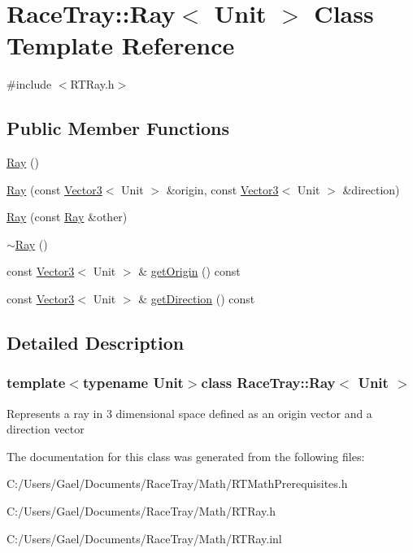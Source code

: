\hypertarget{class_race_tray_1_1_ray}{\section{Race\-Tray\-:\-:Ray$<$ Unit $>$ Class Template Reference}
\label{class_race_tray_1_1_ray}
}


{\ttfamily \#include $<$R\-T\-Ray.\-h$>$}

\subsection*{Public Member Functions}
\begin{DoxyCompactItemize}
\item 
\hyperlink{group___math_ga2e3d2c29f2df4ab3da10da79d4acb852}{Ray} ()
\item 
\hyperlink{group___math_gabe89aef5906b96af94ad94ad0deba455}{Ray} (const \hyperlink{class_race_tray_1_1_vector3}{Vector3}$<$ Unit $>$ \&origin, const \hyperlink{class_race_tray_1_1_vector3}{Vector3}$<$ Unit $>$ \&direction)
\item 
\hyperlink{group___math_ga8e46b1356e03d968ffd813076d6818b2}{Ray} (const \hyperlink{class_race_tray_1_1_ray}{Ray} \&other)
\item 
\hyperlink{group___math_ga8b0e575ce5df046c0c7615c32a96a46f}{$\sim$\-Ray} ()
\item 
const \hyperlink{class_race_tray_1_1_vector3}{Vector3}$<$ Unit $>$ \& \hyperlink{group___math_gab1690c909fff67ff5c878aa6f05bfe2b}{get\-Origin} () const 
\item 
const \hyperlink{class_race_tray_1_1_vector3}{Vector3}$<$ Unit $>$ \& \hyperlink{group___math_gaab0b0ed57af0899286c2996dfdc9418b}{get\-Direction} () const 
\end{DoxyCompactItemize}


\subsection{Detailed Description}
\subsubsection*{template$<$typename Unit$>$class Race\-Tray\-::\-Ray$<$ Unit $>$}

Represents a ray in 3 dimensional space defined as an origin vector and a direction vector 

The documentation for this class was generated from the following files\-:\begin{DoxyCompactItemize}
\item 
C\-:/\-Users/\-Gael/\-Documents/\-Race\-Tray/\-Math/R\-T\-Math\-Prerequisites.\-h\item 
C\-:/\-Users/\-Gael/\-Documents/\-Race\-Tray/\-Math/R\-T\-Ray.\-h\item 
C\-:/\-Users/\-Gael/\-Documents/\-Race\-Tray/\-Math/R\-T\-Ray.\-inl\end{DoxyCompactItemize}
